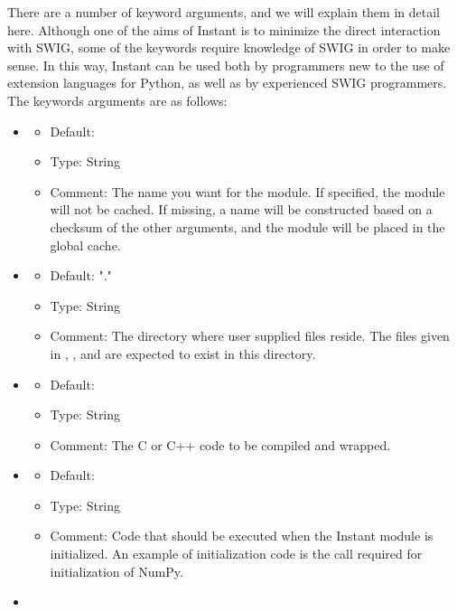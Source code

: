 There are a number of keyword arguments, and we will explain them in detail
here. Although one of the aims of Instant is to minimize the direct
interaction with SWIG, some of the keywords require knowledge of SWIG
in order to make sense. In this way, Instant can be used both by programmers
new to the use of extension languages for Python, as well as by experienced
SWIG programmers. The keywords arguments are as follows:
\begin{itemize}
\item {}
  \begin{itemize}
  \item Default: 
  \item Type: String
  \item Comment: The name you want for the module.
    If specified, the module will not be cached.
    If missing, a name will be constructed based on
    a checksum of the other arguments, and the module
    will be placed in the global cache.
  \end{itemize}
\item {}
  \begin{itemize}
    \item Default: "."
    \item Type: String
    \item Comment: The directory where user supplied files reside. The files
      given in , , and 
      are expected to exist in this directory.
  \end{itemize}
\item {}
  \begin{itemize}
    \item Default: 
    \item Type: String
    \item Comment: The C or C++ code to be compiled and wrapped.
  \end{itemize}
\item {}
  \begin{itemize}
    \item Default: 
    \item Type: String
    \item Comment: Code that should be executed when the Instant module is
      initialized. An
      example of initialization code is the call  required for
      initialization of NumPy.
  \end{itemize}
\item {}

\end{itemize}
